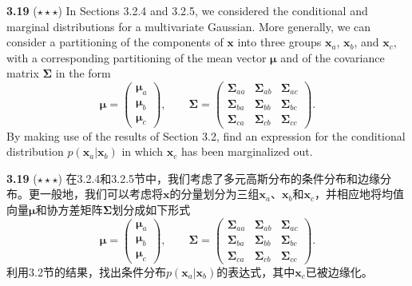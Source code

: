 \documentclass{article}
\begin{document}
\textbf{3.19} ($\star\star\star$) In Sections 3.2.4 and 3.2.5, we considered the conditional and marginal distributions for a multivariate Gaussian. More generally, we can consider a partitioning of the components of $\mathbf{x}$ into three groups $\mathbf{x}_a$, $\mathbf{x}_b$, and $\mathbf{x}_c$, with a corresponding partitioning of the mean vector $\boldsymbol{\mu}$ and of the covariance matrix $\boldsymbol{\Sigma}$ in the form
\begin{equation}
\boldsymbol{\mu} = \begin{pmatrix} \boldsymbol{\mu}_a \\ \boldsymbol{\mu}_b \\ \boldsymbol{\mu}_c \end{pmatrix}, \qquad \boldsymbol{\Sigma} = \begin{pmatrix} \boldsymbol{\Sigma}_{aa} & \boldsymbol{\Sigma}_{ab} & \boldsymbol{\Sigma}_{ac} \\ \boldsymbol{\Sigma}_{ba} & \boldsymbol{\Sigma}_{bb} & \boldsymbol{\Sigma}_{bc} \\ \boldsymbol{\Sigma}_{ca} & \boldsymbol{\Sigma}_{cb} & \boldsymbol{\Sigma}_{cc} \end{pmatrix}. \tag{3.209}
\end{equation}
By making use of the results of Section 3.2, find an expression for the conditional distribution $p(\mathbf{x}_a|\mathbf{x}_b)$ in which $\mathbf{x}_c$ has been marginalized out.

\textbf{3.19} ($\star\star\star$) 在3.2.4和3.2.5节中，我们考虑了多元高斯分布的条件分布和边缘分布。更一般地，我们可以考虑将$\mathbf{x}$的分量划分为三组$\mathbf{x}_a$、$\mathbf{x}_b$和$\mathbf{x}_c$，并相应地将均值向量$\boldsymbol{\mu}$和协方差矩阵$\boldsymbol{\Sigma}$划分成如下形式
\begin{equation}
\boldsymbol{\mu} = \begin{pmatrix} \boldsymbol{\mu}_a \\ \boldsymbol{\mu}_b \\ \boldsymbol{\mu}_c \end{pmatrix}, \qquad \boldsymbol{\Sigma} = \begin{pmatrix} \boldsymbol{\Sigma}_{aa} & \boldsymbol{\Sigma}_{ab} & \boldsymbol{\Sigma}_{ac} \\ \boldsymbol{\Sigma}_{ba} & \boldsymbol{\Sigma}_{bb} & \boldsymbol{\Sigma}_{bc} \\ \boldsymbol{\Sigma}_{ca} & \boldsymbol{\Sigma}_{cb} & \boldsymbol{\Sigma}_{cc} \end{pmatrix}. \tag{3.209}
\end{equation}
利用3.2节的结果，找出条件分布$p(\mathbf{x}_a|\mathbf{x}_b)$的表达式，其中$\mathbf{x}_c$已被边缘化。
\end{document}
